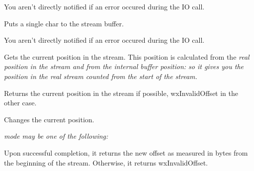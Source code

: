 You aren't directly notified if an error occured during the IO call.





Puts a single char to the stream buffer.


You aren't directly notified if an error occured during the IO call.





Gets the current position in the stream. This position is calculated from
the \it{real} position in the stream and from the internal buffer position: so
it gives you the position in the \it{real} stream counted from the start of
the stream.


Returns the current position in the stream if possible, wxInvalidOffset in the
other case.

\label{wxstreambufferseek}


Changes the current position.

\it{mode} may be one of the following:

\twocolwidtha{5cm}
\begin{twocollist}\itemsep=0pt
\end{twocollist}


Upon successful completion, it returns the new offset as measured in bytes from
the beginning of the stream. Otherwise, it returns wxInvalidOffset.


